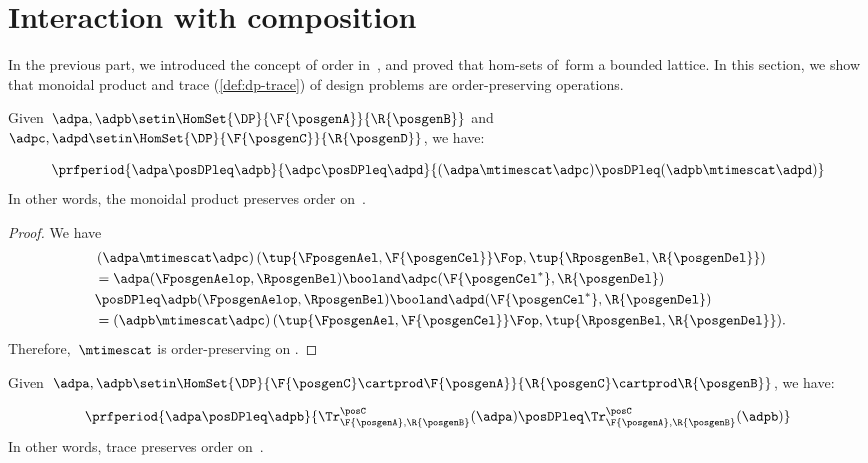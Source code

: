 
\section{Interaction with composition}
In the previous part, we introduced the concept of order in~\DP, and proved that hom-sets of~\DP form a bounded lattice.
In this section, we show that monoidal product and trace (\cref{def:dp-trace}) of design problems are order-preserving operations.


\begin{lemma}
    \label{lem:tens_pres_order}
    Given~$\adpa,\adpb \setin \HomSet{\DP}{\F{\posgenA}}{\R{\posgenB}}$ and~$\adpc,\adpd \setin \HomSet{\DP}{\F{\posgenC}}{\R{\posgenD}}$, we have:

    \begin{equation}
        \prfperiod{
            \adpa\posDPleq \adpb
        }{
            \adpc\posDPleq \adpd
        }{
            (\adpa\mtimescat \adpc )\posDPleq (\adpb\mtimescat \adpd)
        }
    \end{equation}
    In other words, the monoidal product preserves order on~\DP.
\end{lemma}

\begin{proof}
    We have
    \begin{equation}
        \label{eq:tens_pres_ord}
        \begin{aligned}
            ~ & \left( \adpa\mtimescat \adpc\right) (\tup{\FposgenAel,\F{\posgenCel}}\Fop,\tup{\RposgenBel,\R{\posgenDel}}) \\
              & = \adpa(\FposgenAelop,\RposgenBel)\booland \adpc(\F{\posgenCel^*},\R{\posgenDel}) \\
              & \posDPleq \adpb(\FposgenAelop,\RposgenBel)\booland \adpd(\F{\posgenCel^*},\R{\posgenDel}) \\
              & =\left( \adpb\mtimescat \adpc\right) (\tup{\FposgenAel,\F{\posgenCel}}\Fop,\tup{\RposgenBel,\R{\posgenDel}}).
        \end{aligned}
    \end{equation}
    Therefore,~$\mtimescat$ is order-preserving on \DP.
\end{proof}

\begin{lemma}
    \label{lem:trace_pres_order}
    Given~$\adpa,\adpb\setin \HomSet{\DP}{\F{\posgenC}\cartprod \F{\posgenA}}{\R{\posgenC}\cartprod \R{\posgenB}}$, we have:

    \begin{equation}
        \prfperiod{\adpa\posDPleq \adpb}{\Tr_{\F{\posgenA},\R{\posgenB}}^\posC(\adpa)\posDPleq \Tr_{\F{\posgenA},\R{\posgenB}}^\posC(\adpb)}
    \end{equation}
    In other words, trace preserves order on~\DP.
\end{lemma}

